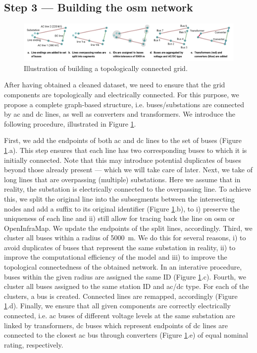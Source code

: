 \documentclass[fleqn,10pt]{wlscirep}
\let\autocite\cite
\begin{document}
\subsection*{Step 3 --- Building the \gls{osm} network}
\begin{figure}[!htbp]
    \centering
    \includegraphics[width=\linewidth]{figures/fig_build_osm_network.pdf}
    \caption{Illustration of building a topologically connected grid.}
    \label{fig:build_osm_network}
\end{figure}

After having obtained a cleaned dataset, we need to ensure that the grid components are topologically and electrically connected. For this purpose, we propose a complete graph-based structure, i.e. buses/substations are connected by \acrshort{ac} and \acrshort{dc} lines, as well as converters and transformers. We introduce the following procedure, illustrated in Figure \ref{fig:build_osm_network}.

First, we add the endpoints of both \acrshort{ac} and \acrshort{dc} lines to the set of buses (Figure \ref{fig:build_osm_network}.a). This step ensures that each line has two corresponding buses to which it is initially connected. Note that this may introduce potential duplicates of buses beyond those already present --- which we will take care of later. Next, we take of long lines that are overpassing (multiple) substations. Here we assume that in reality, the substation is electrically connected to the overpassing line. To achieve this, we split the original line into the subsegments between the intersecting nodes and add a suffix to its original identifier (Figure \ref{fig:build_osm_network}.b), to i) preserve the uniqueness of each line and ii) still allow for tracing back the line on \acrshort{osm} or OpenInfraMap.\autocite{garrettOpenInfrastructureMap2024} We update the endpoints of the split lines, accordingly. Third, we cluster all buses within a radius of \SI{5000}{\meter}. We do this for several reasons, i) to avoid duplicates of buses that represent the same substation in reality, ii) to improve the computational efficiency of the model and iii) to improve the topological connectedness of the obtained network. In an interative procedure, buses within the given radius are assigned the same ID (Figure \ref{fig:build_osm_network}.c). Fourth, we cluster all buses assigned to the same station ID and \acrshort{ac}/\acrshort{dc} type. For each of the clusters, a bus is created. Connected lines are remapped, accordingly (Figure \ref{fig:build_osm_network}.d). Finally, we ensure that all given components are correctly electrically connected, i.e. \acrshort{ac} buses of different voltage levels at the same substation are linked by transformers, \acrshort{dc} buses which represent endpoints of \acrshort{dc} lines are connected to the closest \acrshort{ac} bus through converters (Figure \ref{fig:build_osm_network}.e) of equal nominal rating, respectively.
\end{document}
